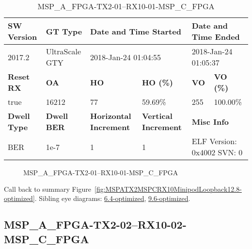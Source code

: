 \begin{table}[h]
\centering
\caption{MSP\_A\_FPGA-TX2-01--RX10-01-MSP\_C\_FPGA}
\label{tab:MSPAFPGATX201RX1001MSPCFPGA12.8-optimized}
\begin{tabular}{@{}|l|l|l|l|l|l|@{}}
\toprule
\textbf{SW Version}                & \textbf{GT Type}   & \multicolumn{2}{l|}{\textbf{Date and Time Started}}            & \multicolumn{2}{l|}{\textbf{Date and Time Ended}}        \\ \midrule
2017.2                       & UltraScale GTY          & \multicolumn{2}{l|}{2018-Jan-24 01:04:55}                   & \multicolumn{2}{l|}{2018-Jan-24 01:05:37}               \\ \midrule
\textbf{Reset RX}                  & \textbf{OA} & \textbf{HO}   & \textbf{HO (\%)} & \textbf{VO} & \textbf{VO (\%)} \\ \midrule
true & 16212        & 77          & 59.69\%        & 255        & 100.00\%       \\ \midrule
\textbf{Dwell Type}                & \textbf{Dwell BER} & \textbf{Horizontal Increment} & \textbf{Vertical Increment}    & \multicolumn{2}{l|}{\textbf{Misc Info}}                  \\ \midrule
BER                            & 1e-7        & 1        & 1           & \multicolumn{2}{l|}{ELF Version: 0x4002 SVN: 0}                         \\ \bottomrule
\end{tabular}
\end{table}

\begin{figure}[h]
\caption{MSP\_A\_FPGA-TX2-01--RX10-01-MSP\_C\_FPGA} \label{fig:MSPAFPGATX201RX1001MSPCFPGA12.8-optimized}
\end{figure}

Call back to summary Figure~\ref{fig:MSPATX2MSPCRX10MinipodLoopback12.8-optimized}.
Sibling eye diagrams: \hyperref[sec:MSPAFPGATX201RX1001MSPCFPGA6.4-optimized]{6.4-optimized}, \hyperref[sec:MSPAFPGATX201RX1001MSPCFPGA9.6-optimized]{9.6-optimized}.

\clearpage
\newpage


\subsection{MSP\_A\_FPGA-TX2-02--RX10-02-MSP\_C\_FPGA}\label{sec:MSPAFPGATX202RX1002MSPCFPGA12.8-optimized}

